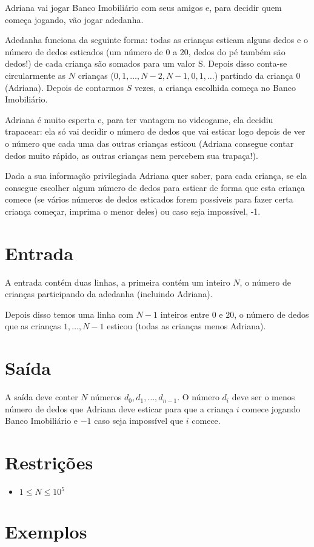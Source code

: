 Adriana vai jogar Banco Imobiliário com seus amigos e, para decidir quem começa jogando, vão jogar adedanha.

Adedanha funciona da seguinte forma: todas as crianças esticam alguns dedos e o número de dedos esticados (um número de $0$ a $20$, dedos do pé também são dedos!) de cada criança são somados para um valor S. Depois disso conta-se circularmente as $N$ crianças ($0, 1, \ldots, N - 2, N - 1, 0, 1, \ldots$) partindo da criança $0$ (Adriana). Depois de contarmos $S$ vezes, a criança escolhida começa no Banco Imobiliário.

Adriana é muito esperta e, para ter vantagem no videogame, ela decidiu trapacear: ela só vai decidir o número de dedos que vai esticar logo depois de ver o número que cada uma das outras crianças esticou (Adriana consegue contar dedos muito rápido, as outras crianças nem percebem sua trapaça!).

Dada a sua informação privilegiada Adriana quer saber, para cada criança, se ela consegue escolher algum número de dedos para esticar de forma que esta criança comece (se vários números de dedos esticados forem possíveis para fazer certa criança começar, imprima o menor deles) ou caso seja impossível, -1.

\section*{Entrada}

A entrada contém duas linhas, a primeira contém um inteiro $N$, o número de crianças participando da adedanha (incluindo Adriana).

Depois disso temos uma linha com $N - 1$ inteiros entre $0$ e $20$, o número de dedos que as crianças $1,\ldots,N - 1$ esticou (todas as crianças menos Adriana). 
\section*{Saída}

A saída deve conter $N$ números $d_0, d_1, \ldots, d_{n - 1}$. O número $d_i$ deve ser o menos número de dedos que Adriana deve esticar para que a criança $i$ comece jogando Banco Imobiliário e $-1$ caso seja impossível que $i$ comece.

\section*{Restrições}

\begin{itemize}
\item $1 \leq N \leq 10^5$
\end{itemize}

\section*{Exemplos}